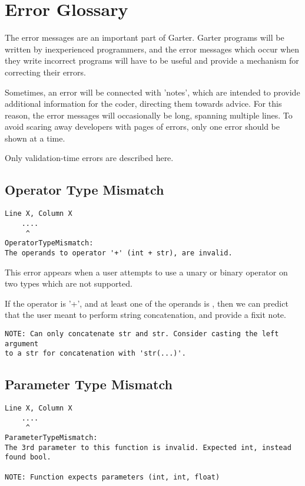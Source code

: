 \glsresetall %
\chapter{Error Glossary}\label{ch:ErrorGlossary}

The error messages are an important part of Garter. Garter programs will be
written by inexperienced programmers, and the error messages which occur when
they write incorrect programs will have to be useful and provide a mechanism for
correcting their errors.

Sometimes, an error will be connected with 'notes', which are intended to
provide additional information for the coder, directing them towards advice. For
this reason, the error messages will occasionally be long, spanning multiple
lines. To avoid scaring away developers with pages of errors, only one error
should be shown at a time.

Only validation-time errors are described here. 

\section{Operator Type Mismatch}
\begin{lstlisting}[breaklines]
Line X, Column X
    ....
     ^
OperatorTypeMismatch:
The operands to operator '+' (int + str), are invalid.
\end{lstlisting}

This error appears when a user attempts to use a unary or binary operator on two types
which are not supported.

If the operator is '+', and at least one of the operands is , then we
can predict that the user meant to perform string concatenation, and provide
a fixit note.

\begin{lstlisting}[breaklines]
NOTE: Can only concatenate str and str. Consider casting the left argument
to a str for concatenation with 'str(...)'. 
\end{lstlisting}

\section{Parameter Type Mismatch}
\begin{lstlisting}[breaklines]
Line X, Column X
    ....
     ^
ParameterTypeMismatch:
The 3rd parameter to this function is invalid. Expected int, instead found bool.

NOTE: Function expects parameters (int, int, float)
\end{lstlisting}

